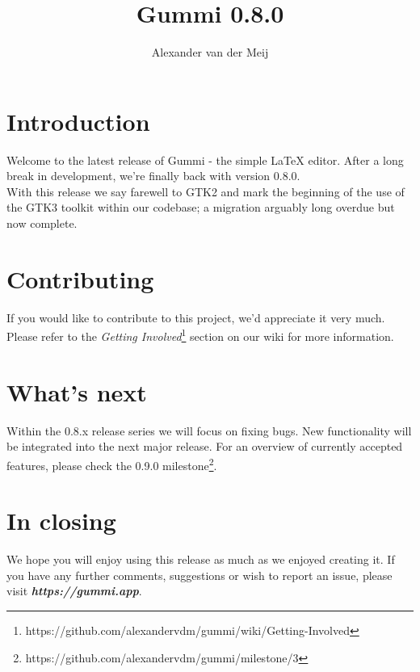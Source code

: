 \documentclass[11pt]{article}
\title{\textbf{Gummi 0.8.0}}
\author{Alexander van der Meij}
\date{}
\begin{document}
\maketitle
\thispagestyle{empty}

\section{Introduction}
Welcome to the latest release of Gummi - the simple {\LaTeX} editor. After a long break in development, we're finally back with version 0.8.0.\\
With this release we say farewell to GTK2 and mark the beginning of the use of the GTK3 toolkit within our codebase; a migration arguably long overdue but now complete. 

\section{Contributing}
If you would like to contribute to this project, we'd appreciate it very much. Please refer to the \emph{Getting Involved}\footnote{https://github.com/alexandervdm/gummi/wiki/Getting-Involved} section on our wiki for more information. 

\section{What's next}

Within the 0.8.x release series we will focus on fixing bugs. New functionality will be integrated into the next major release. For an overview of currently accepted features, please check the 0.9.0 milestone\footnote{https://github.com/alexandervdm/gummi/milestone/3}.

\section{In closing}
We hope you will enjoy using this release as much as we enjoyed creating it. If you have any further comments, suggestions or wish to report an issue, please visit \emph{\textbf{https://gummi.app}}. 
\end{document}
